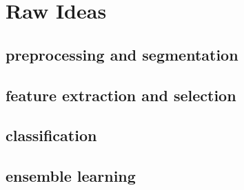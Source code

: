 \section{Raw Ideas}

\subsection{preprocessing and segmentation}

\subsection{feature extraction and selection}

\subsection{classification}

\subsection{ensemble learning}

